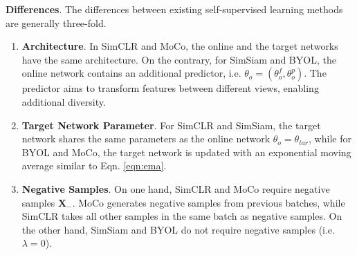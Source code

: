 \documentclass[11pt]{article}
\begin{document}
\textbf{Differences}. The differences between existing self-supervised learning methods are generally three-fold.
\begin{enumerate}
    \item \textbf{Architecture}. In SimCLR and MoCo, the online and the target networks have the same architecture. On the contrary, for SimSiam and BYOL, the online network contains an additional predictor, i.e. $\theta_o = (\theta_o^f, \theta_o^p)$. The predictor aims to transform features between different views, enabling additional diversity.
    \item \textbf{Target Network Parameter}. For SimCLR and SimSiam, the target network shares the same parameters as the online network $\theta_o=\theta_{tar}$, while for BYOL and MoCo, the target network is updated with an exponential moving average similar to Eqn. \ref{eqn:ema}.
    \item \textbf{Negative Samples}. On one hand, SimCLR and MoCo require negative samples $\mathbf{X}_-$. MoCo generates negative samples from previous batches, while SimCLR takes all other samples in the same batch as negative samples. On the other hand, SimSiam and BYOL do not require negative samples (i.e. $\lambda = 0$).
\end{enumerate}
\end{document}
